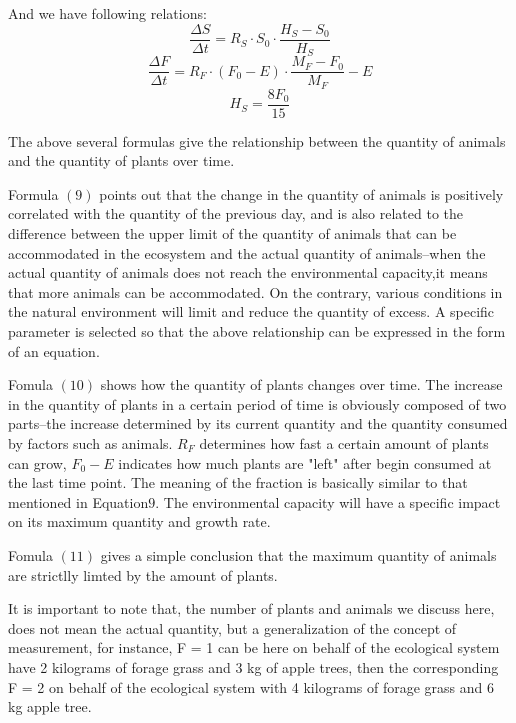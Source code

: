 \documentclass{mcmthesis}
\begin{document}
And we have following relations:
\begin{equation}
    \frac{\varDelta S}{\varDelta t}=R_{S}\cdot S_{0}\cdot \frac{H_{S}-S_{0}}{H_{S}}
\end{equation}
\begin{equation}
    \frac{\varDelta F}{\varDelta t}=R_{F}\cdot (F_{0}-E)\cdot \frac{M_{F}-F_{0}}{M_{F}}-E
\end{equation}
\begin{equation}
    H_{S}=\frac{8F_{0}}{15}
\end{equation}

The above several formulas give the relationship between the quantity of animals and the quantity of plants over time.

Formula $(9)$ points out that the change in the quantity of animals is positively correlated with the quantity of the previous day, and is also related to the difference between the upper limit of the quantity of animals that can be accommodated in the ecosystem and the actual quantity of animals--when the actual quantity of animals does not reach the environmental capacity,it means that more animals can be accommodated. On the contrary, various conditions in the natural environment will limit and reduce the quantity of excess. A specific parameter is selected so that the above relationship can be expressed in the form of an equation.

Fomula $(10)$ shows how the quantity of plants changes over time. The increase in the quantity of plants in a certain period of time is obviously composed of two parts--the increase determined by its current quantity and the quantity consumed by factors such as animals. $R_F$ determines how fast a certain amount of plants can grow, $F_0-E$ indicates how much plants are "left" after begin consumed at the last time point. The meaning of the fraction is basically similar to that mentioned in Equation$9$. The environmental capacity will have a specific impact on its maximum quantity and growth rate.

Fomula $(11)$ gives a simple conclusion that the maximum quantity of animals are strictlly limted by the amount of plants.

It is important to note that, the number of plants and animals we discuss here, does not mean the actual quantity, but a generalization of the concept of measurement, for instance, F = 1 can be here on behalf of the ecological system have 2 kilograms of forage grass and 3 kg of apple trees, then the corresponding F = 2 on behalf of the ecological system with 4 kilograms of forage grass and 6 kg apple tree.
\end{document}

